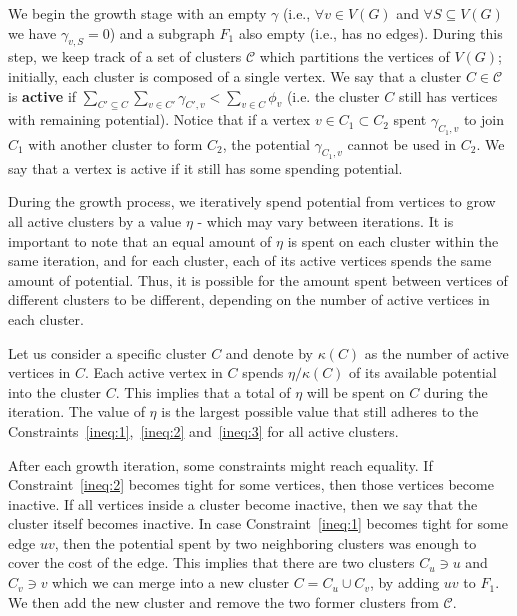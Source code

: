 We begin the growth stage with an empty \(\gamma\) (i.e., \(\forall v \in V(G)\) and \(\forall S \subseteq V(G)\) we have \(\gamma_{v, S} = 0\)) and a subgraph \(F_1\) also empty (i.e., has no edges). During this step, we keep track of a set of clusters \(\mathcal{C}\) which partitions the vertices of \(V(G)\); initially, each cluster is composed of a single vertex. We say that a cluster \(C \in \mathcal{C}\) is \textbf{active} if \(\sum_{C' \subseteq C} \sum_{v \in C'} \gamma_{C', v} < \sum_{v \in C} \phi_v\) (i.e. the cluster \(C\) still has vertices with remaining potential). Notice that if a vertex \(v \in C_1 \subset C_2\) spent \(\gamma_{C_1, v}\) to join \(C_1\) with another cluster to form \(C_2\), the potential \(\gamma_{C_1, v}\) cannot be used in \(C_2\). We say that a vertex is active if it still has some spending potential.

During the growth process, we iteratively spend potential from vertices to grow all active clusters by a value \(\eta\) - which may vary between iterations. It is important to note that an equal amount of \(\eta\) is spent on each cluster within the same iteration, and for each cluster, each of its active vertices spends the same amount of potential. Thus, it is possible for the amount spent between vertices of different clusters to be different, depending on the number of active vertices in each cluster.

Let us consider a specific cluster \(C\) and denote by \(\kappa(C)\) as the number of active vertices in \(C\). Each active vertex in \(C\) spends \(\eta / \kappa(C)\) of its available potential into the cluster \(C\). This implies that a total of \(\eta\) will be spent on \(C\) during the iteration.
The value of \(\eta\) is the largest possible value that still adheres to the Constraints~\eqref{ineq:1},~\eqref{ineq:2} and~\eqref{ineq:3} for all active clusters.

After each growth iteration, some constraints might reach equality. If Constraint~\eqref{ineq:2} becomes tight for some vertices, then those vertices become inactive. 
If all vertices inside a cluster become inactive, then we say that the cluster itself becomes inactive. 
In case Constraint~\eqref{ineq:1} becomes tight for some edge \(uv\), then the potential spent by two neighboring clusters was enough to cover the cost of the edge. This implies that there are two clusters \(C_u \ni u\) and \(C_v \ni v\) which we can merge into a new cluster \(C = C_u \cup C_v\), by adding \(uv\) to \(F_1\). We then add the new cluster and remove the two former clusters from \(\mathcal{C}\).

